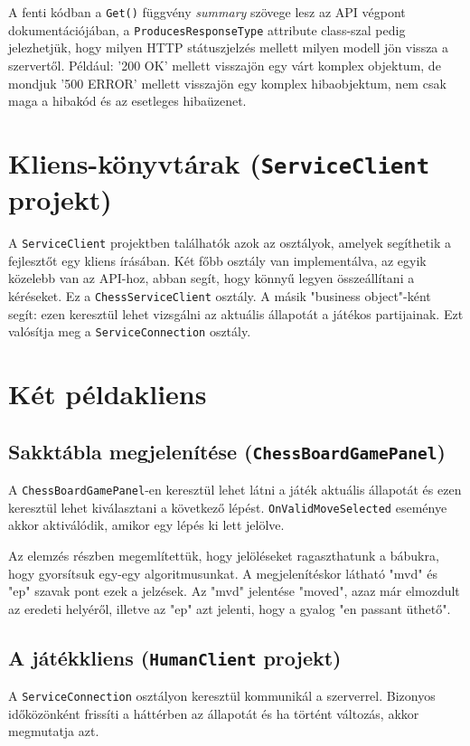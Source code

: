 \documentclass[twoside, a4paper, 12pt]{book}
\begin{document}
A fenti kódban a \texttt{Get()} függvény \textit{summary} szövege lesz az API végpont dokumentációjában, a \texttt{ProducesResponseType} attribute class-szal pedig jelezhetjük, hogy milyen HTTP státuszjelzés mellett milyen modell jön vissza a szervertől. Például: '200 OK' mellett visszajön egy várt komplex objektum, de mondjuk '500 ERROR' mellett visszajön egy komplex hibaobjektum, nem csak maga a hibakód és az esetleges hibaüzenet.

\section{Kliens-könyvtárak (\texttt{ServiceClient} projekt)}
A \texttt{ServiceClient} projektben találhatók azok az osztályok, amelyek segíthetik a fejlesztőt egy kliens írásában. Két főbb osztály van implementálva, az egyik közelebb van az API-hoz, abban segít, hogy könnyű legyen összeállítani a kéréseket. Ez a \texttt{ChessServiceClient} osztály. A másik "business object"-ként segít: ezen keresztül lehet vizsgálni az aktuális állapotát a játékos partijainak. Ezt valósítja meg a \texttt{ServiceConnection} osztály.

\section{Két példakliens}
\subsection{Sakktábla megjelenítése (\texttt{ChessBoardGamePanel})}
A \texttt{ChessBoardGamePanel}-en keresztül lehet látni a játék aktuális állapotát és ezen keresztül lehet kiválasztani a következő lépést. \texttt{OnValidMoveSelected} eseménye akkor aktiválódik, amikor egy lépés ki lett jelölve.

Az elemzés részben megemlítettük, hogy jelöléseket ragaszthatunk a bábukra, hogy gyorsítsuk egy-egy algoritmusunkat. A megjelenítéskor látható "mvd" és "ep" szavak pont ezek a jelzések. Az "mvd" jelentése "moved", azaz már elmozdult az eredeti helyéről, illetve az "ep" azt jelenti, hogy a gyalog "en passant üthető".

\subsection{A játékkliens (\texttt{HumanClient} projekt)}
A \texttt{ServiceConnection} osztályon keresztül kommunikál a szerverrel. Bizonyos időközönként frissíti a háttérben az állapotát és ha történt változás, akkor megmutatja azt.
\end{document}
